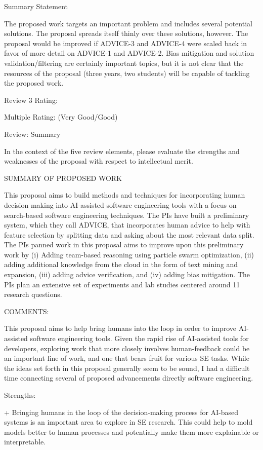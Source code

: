 Summary Statement

The proposed work targets an important problem and includes several potential solutions. The proposal spreads itself thinly over these solutions, however. The proposal would be improved if ADVICE-3 and ADVICE-4 were scaled back in favor of more detail on ADVICE-1 and ADVICE-2. Bias mitigation and solution validation/filtering are certainly important topics, but it is not clear that the resources of the proposal (three years, two students) will be capable of tackling the proposed work.

Review 3
Rating:

Multiple Rating: (Very Good/Good)

Review:
Summary

In the context of the five review elements, please
evaluate the strengths and weaknesses of the proposal with respect to intellectual merit.

SUMMARY OF PROPOSED WORK

This proposal aims to build methods and techniques for incorporating human decision making into AI-assisted software engineering tools with a focus on search-based software engineering techniques. The PIs have built a preliminary system, which they call ADVICE, that incorporates human advice to help with feature selection by splitting data and asking about the most relevant data split. The PIs panned work in this proposal aims to improve upon this preliminary work by (i) Adding team-based reasoning using particle swarm optimization, (ii) adding additional knowledge from the cloud in the form of text mining and expansion, (iii) adding advice verification, and (iv) adding bias mitigation. The PIs plan an extensive set of experiments and lab studies centered around 11 research questions.

COMMENTS:

This proposal aims to help bring humans into the loop in order to improve AI-assisted software engineering tools. Given the rapid rise of AI-assisted tools for developers, exploring work that more closely involves human-feedback could be an important line of work, and one that bears fruit for various SE tasks. While the ideas set forth in this proposal generally seem to be sound, I had a difficult time connecting several of proposed advancements directly software engineering.

Strengths:

+ Bringing humans in the loop of the decision-making process for AI-based systems is an important area to explore in SE research. This could help to mold models better to human processes and potentially make them more explainable or interpretable.

